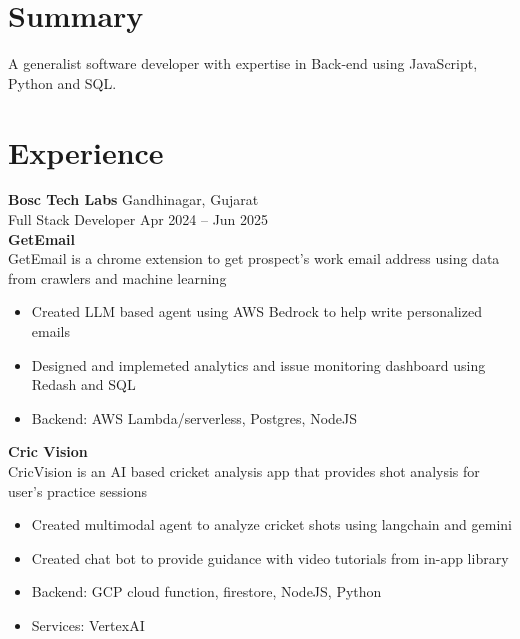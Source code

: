 \documentclass[a4paper]{article}
\begin{document}

\fancyhead[C]{
}


\section{Summary}

A generalist software developer with expertise in Back-end using JavaScript, Python and SQL.

\section{Experience}
\noindent
\textbf{Bosc Tech Labs} \hfill Gandhinagar, Gujarat \\
Full Stack Developer \hfill Apr 2024 -- Jun 2025 \\
\textbf{GetEmail} \\
GetEmail is a chrome extension to get prospect's work email address using data from crawlers and machine learning
\begin{itemize}
	\item Created LLM based agent using AWS Bedrock to help write personalized emails
	\item Designed and implemeted analytics and issue monitoring dashboard using Redash and SQL
	\item Backend: AWS Lambda/serverless, Postgres, NodeJS
\end{itemize}

\noindent
\textbf{Cric Vision} \\
CricVision is an AI based cricket analysis app that provides shot analysis for user's practice sessions
\begin{itemize}
	\item Created multimodal agent to analyze cricket shots using langchain and gemini
	\item Created chat bot to provide guidance with video tutorials from in-app library
	\item Backend: GCP cloud function, firestore, NodeJS, Python
	\item Services: VertexAI
\end{itemize}
\end{document}
